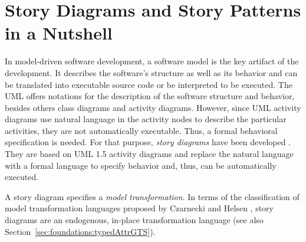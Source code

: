 \section{Story Diagrams and Story Patterns in a Nutshell} \label{sec:Overview}



In model-driven software development, a software model is the key artifact of the development.
It describes the software's structure as well as its behavior and 
can be translated into executable source code or be interpreted to be executed.
The UML offers notations for the description of the software structure and behavior,
besides others class diagrams and activity diagrams.
However, since UML activity diagrams use natural language in the activity nodes to describe the particular activities, they are not automatically executable.
Thus, a formal behavioral specification is needed.
For that purpose, \emph{story diagrams} have been developed \cite{FNTZ00,Zun01}.
They are based on UML 1.5 activity diagrams \cite{UML1.5} and replace the natural language with a formal language to specify behavior
and, thus, can be automatically executed.

A story diagram specifies a \emph{model transformation}.
In terms of the classification of model transformation languages proposed by Czarnecki and Helsen \cite{Czarnecki06},
story diagrams are an endogenous, in-place transformation language (see also Section~\ref{sec:foundations:typedAttrGTS}).


